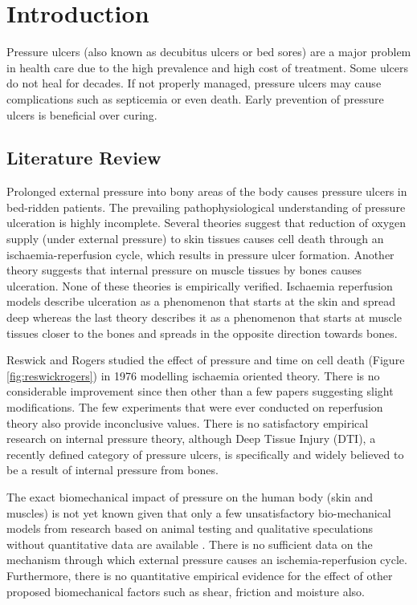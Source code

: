 \chapter{Introduction}
\label{chapter:introduction}

Pressure ulcers (also known as decubitus ulcers or bed sores) are a major problem in health care due to the high prevalence and high cost of treatment. Some ulcers do not heal for decades. If not properly managed, pressure ulcers may cause complications such as septicemia or even death. Early prevention of pressure ulcers is beneficial over curing. \cite{npuapguide}


\section{Literature Review}
Prolonged external pressure into bony areas of the body causes pressure ulcers in bed-ridden patients. The prevailing pathophysiological understanding of pressure ulceration is highly incomplete. Several theories suggest that reduction of oxygen supply (under external pressure) to skin tissues causes cell death through an ischaemia-reperfusion cycle, which results in pressure ulcer formation. Another theory suggests that internal pressure on muscle tissues by bones causes ulceration. \cite{putheories} None of these theories is empirically verified. Ischaemia reperfusion models describe ulceration as a phenomenon that starts at the skin and spread deep whereas the last theory describes it as a phenomenon that starts at muscle tissues closer to the bones and spreads in the opposite direction towards bones. 

Reswick and Rogers studied the effect of pressure and time on cell death (Figure \ref{fig:reswickrogers}) in 1976 modelling ischaemia oriented theory.\cite{inverserel} There is no considerable improvement since then other than a few papers suggesting slight modifications. The few experiments that were ever conducted on reperfusion theory also provide inconclusive values. There is no satisfactory empirical research on internal pressure theory, although Deep Tissue Injury (DTI), a recently defined category of pressure ulcers, is specifically and widely believed to be a result of internal pressure from bones. \cite{deephypo}


The exact biomechanical impact of pressure on the human body (skin and muscles) is not yet known given that only a few unsatisfactory bio-mechanical models from research based on animal testing \cite{animalmodels}  and qualitative speculations without quantitative data are available \cite{bloodflow,celldeaththresh,cyclicpressure}. There is no sufficient data on the mechanism through which external pressure causes an ischemia-reperfusion cycle. Furthermore, there is no quantitative empirical evidence for the effect of other proposed biomechanical factors such as shear, friction and moisture also. 

